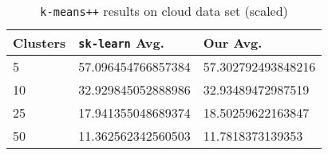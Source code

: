 \documentclass[twoside, 11pt]{article}
\begin{document}
		\begin{table}[p]
			\begin{center}
				\begin{tabular}{|l|l|l|}
					\hline
					Clusters & \texttt{sk-learn} Avg. & Our Avg.\\\hline
					5 & 57.096454766857384 & 57.302792493848216\\\hline
					10 & 32.929845052888986 & 32.93489472987519\\\hline
					25 & 17.941355048689374 & 18.50259622163847\\\hline
					50 & 11.362562342560503 & 11.7818373139353\\\hline
				\end{tabular}
				\caption{\texttt{k-means++} results on cloud data set (scaled)}
				\label{tbl:cloud_minmaxscaler}
			\end{center}
		\end{table}
	\clearpage
\end{document}
